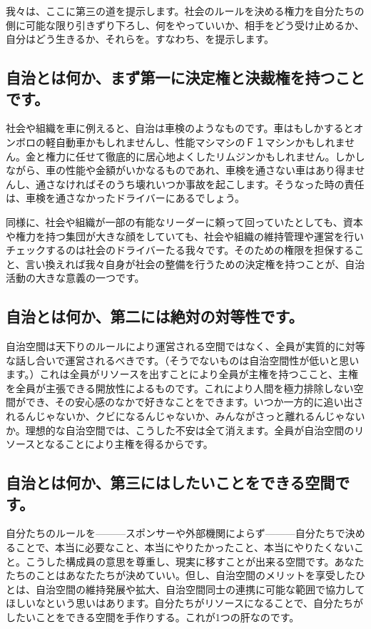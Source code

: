 我々は、ここに第三の道を提示します。社会のルールを決める権力を自分たちの側に可能な限り引きずり下ろし、何をやっていいか、相手をどう受け止めるか、自分はどう生きるか、それらを。すなわち、を提示します。

\subsection{自治とは何か、まず第一に決定権と決裁権を持つことです。}
社会や組織を車に例えると、自治は車検のようなものです。車はもしかするとオンボロの軽自動車かもしれませんし、性能マシマシのＦ１マシンかもしれません。金と権力に任せて徹底的に居心地よくしたリムジンかもしれません。しかしながら、車の性能や金額がいかなるものであれ、車検を通さない車はあり得ませんし、通さなければそのうち壊れいつか事故を起こします。そうなった時の責任は、車検を通さなかったドライバーにあるでしょう。

同様に、社会や組織が一部の有能なリーダーに頼って回っていたとしても、資本や権力を持つ集団が大きな顔をしていても、社会や組織の維持管理や運営を行いチェックするのは社会のドライバーたる我々です。そのための権限を担保すること、言い換えれば我々自身が社会の整備を行うための決定権を持つことが、自治活動の大きな意義の一つです。
 
\subsection{自治とは何か、第二には絶対の対等性です。}
自治空間は天下りのルールにより運営される空間ではなく、全員が実質的に対等な話し合いで運営されるべきです。（そうでないものは自治空間性が低いと思います。）これは全員がリソースを出すことにより全員が主権を持つここと、主権を全員が主張できる開放性によるものです。これにより人間を極力排除しない空間ができ、その安心感のなかで好きなことをできます。いつか一方的に追い出されるんじゃないか、クビになるんじゃないか、みんながさっと離れるんじゃないか。理想的な自治空間では、こうした不安は全て消えます。全員が自治空間のリソースとなることにより主権を得るからです。
 
\subsection{自治とは何か、第三にはしたいことをできる空間です。}
自分たちのルールを---------スポンサーや外部機関によらず---------自分たちで決めることで、本当に必要なこと、本当にやりたかったこと、本当にやりたくないこと。こうした構成員の意思を尊重し、現実に移すことが出来る空間です。あなたたちのことはあなたたちが決めていい。但し、自治空間のメリットを享受したひとは、自治空間の維持発展や拡大、自治空間同士の連携に可能な範囲で協力してほしいなという思いはあります。自分たちがリソースになることで、自分たちがしたいことをできる空間を手作りする。これが1つの肝なのです。
 
